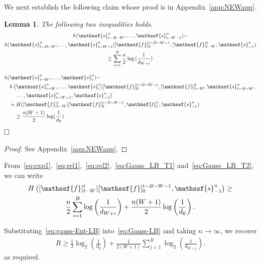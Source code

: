 \documentclass[journal, twocolumn, 10pt]{IEEEtran}
\newtheorem{lemma}{Lemma}
\newcommand{\rvf}{{\mathssf{f}}}    %
\newcommand{\rvs}{{\mathssf{s}}}    %
\newcommand{\rvbt}{{\mathbsf{t}}}
\begin{document}
{We next establish the following claim whose proof is in Appendix~\ref{app:NEWapp}.

\begin{lemma}
\label{claim:converse}
The following two inequalities holds. 
\begin{multline}
h(\rvs_{t-B-W}^n, \ldots, \rvs_{t-W-1}^n)- \\ h(\rvs_{t-B-W}^n, \ldots, \rvs_{t-W-1}^n|[\rvf]_{0}^{{t-B-W-1}}, [\rvf]_{t-W}^{t}, \rvs_{-1}^n)\\
 \ge \sum_{i=1}^{B}\frac{n}{2}\log{(\frac{1}{d_{W+i}})}\label{eq:Gauss_LB_T1}
\end{multline}

\begin{align}
&h(\rvs_{t-W}^n, \ldots, \rvs_{t}^n)- \notag\\
&\quad h\left(\rvs_{t-W}^n, \ldots, \rvs_{t}^n| [\rvf]_{0}^{{t-B-W-1}},[\rvf]_{t-W}^{t},\rvs_{t-B-W}^n, \right.\notag\\
&\left.\quad \quad \ldots, \rvs_{t-W-1}^n, \rvs_{-1}^n\right)\notag\\ 
&\quad+ H([\rvf]_{t-W}^{t}|[\rvf]_{0}^{{t-B-W-1}}, \rvbt_{t}^n, \rvs_{-1}^n) \notag\\
&\quad \quad \ge \frac{n(W+1)}{2}\log(\frac{1}{d_0})
\label{eq:Gauss_LB_T2}
\end{align}
$\hfill\Box$
\end{lemma}

\begin{proof}
See Appendix~\ref{app:NEWapp}.
\end{proof}

From~\eqref{eq:exp1},~\eqref{eq:rel1},~\eqref{eq:rel2},~\eqref{eq:Gauss_LB_T1} and~\eqref{eq:Gauss_LB_T2}, we can write
\begin{multline}
H\left([\rvf]_{t-W}^{t} | [\rvf]_{0}^{t-B-W-1}, \rvs_{-1}^n\right)  \ge \\ \frac{n}{2}\sum_{i=1}^{B} \log \left(\frac{1}{ d_{W+i}}\right) + \frac{n(W+1)}{2}\log\left(\frac{1}{d_{0}}\right) \label{eq:gauss-Ent-LB}.
\end{multline}

Substituting~\eqref{eq:gauss-Ent-LB} into~\eqref{eq:Gauss-LB} 
and taking $n\rightarrow \infty$, we recover 
\begin{align}
R \ge \frac{1}{2}\log_{2}\left(\frac{1}{d_{0}}\right) + \frac{1}{2(W+1)}\sum_{j=1}^{B} \log_2 \left(\frac{1}{ d_{W+j}}\right).
\end{align} as required.



}
\end{document}
